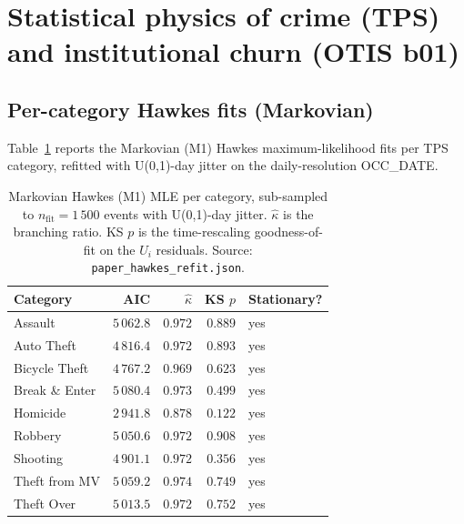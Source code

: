 \documentclass[article,shortnames,nojss]{jss}
\newcommand{\OTIS}{\textsf{OTIS}}
\newcommand{\TPS}{\textsf{TPS}}
\begin{document}
\section[Statistical physics of crime and institutional churn]{Statistical physics of crime (\TPS{}) and institutional churn (\OTIS{} b01)}\label{sec:physics-results}

\subsection{Per-category Hawkes fits (Markovian)}\label{phys-hawkes}

Table~\ref{tab:hawkes-markovian} reports the Markovian (M1) Hawkes
maximum-likelihood fits per TPS category, refitted with U(0,1)-day
jitter on the daily-resolution OCC\_DATE.

\begin{table}[h]
\centering\small
\caption{Markovian Hawkes (M1) MLE per category, sub-sampled to
$n_{\mathrm{fit}} = 1\,500$ events with U(0,1)-day jitter.
$\hat\kappa$ is the branching ratio.  KS $p$ is the time-rescaling
goodness-of-fit on the $U_i$ residuals.  Source:
\texttt{paper\_hawkes\_refit.json}.}\label{tab:hawkes-markovian}
\begin{tabular}{lrrrl}
\toprule
Category & AIC & $\hat\kappa$ & KS $p$ & Stationary?\\\midrule
Assault                       & $5\,062.8$ & $0.972$ & $0.889$ & yes\\
Auto Theft                    & $4\,816.4$ & $0.972$ & $0.893$ & yes\\
Bicycle Theft                 & $4\,767.2$ & $0.969$ & $0.623$ & yes\\
Break \& Enter                & $5\,080.4$ & $0.973$ & $0.499$ & yes\\
Homicide                      & $2\,941.8$ & $0.878$ & $0.122$ & yes\\
Robbery                       & $5\,050.6$ & $0.972$ & $0.908$ & yes\\
Shooting                      & $4\,901.1$ & $0.972$ & $0.356$ & yes\\
Theft from MV                 & $5\,059.2$ & $0.974$ & $0.749$ & yes\\
Theft Over                    & $5\,013.5$ & $0.972$ & $0.752$ & yes\\
\bottomrule
\end{tabular}
\end{table}
\end{document}
